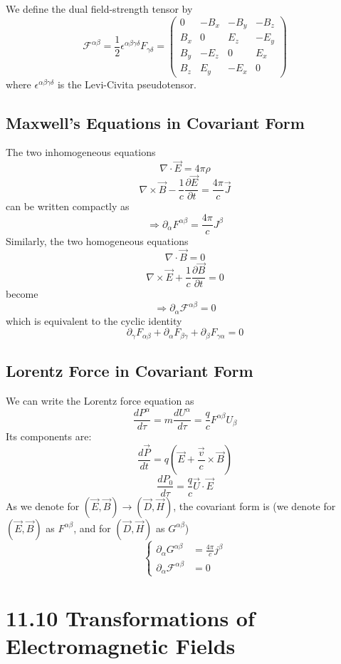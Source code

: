 \documentclass{article}
\begin{document}
	We define the dual field-strength tensor by
	\[
	\mathcal{F}^{\alpha\beta} = \frac{1}{2}\epsilon^{\alpha\beta\gamma\delta}F_{\gamma\delta} = 
	\begin{pmatrix}
		0 & -B_x & -B_y & -B_z \\
		B_x & 0 & E_z & -E_y \\
		B_y & -E_z & 0 & E_x \\
		B_z & E_y & -E_x & 0
	\end{pmatrix}
	\]
	where $\epsilon^{\alpha\beta\gamma\delta}$ is the Levi-Civita pseudotensor.
	
	\subsection*{Maxwell's Equations in Covariant Form}
	The two inhomogeneous equations
	\[
	\nabla \cdot \vec{E} = 4\pi\rho
	\]
	\[
	\nabla \times \vec{B} - \frac{1}{c}\frac{\partial\vec{E}}{\partial t} = \frac{4\pi}{c}\vec{J}
	\]
	can be written compactly as
	\[
	\Rightarrow \partial_\alpha F^{\alpha\beta} = \frac{4\pi}{c}J^\beta
	\]
	Similarly, the two homogeneous equations
	\[
	\nabla \cdot \vec{B} = 0
	\]
	\[
	\nabla \times \vec{E} + \frac{1}{c}\frac{\partial\vec{B}}{\partial t} = 0
	\]
	become
	\[
	\Rightarrow \partial_\alpha \mathcal{F}^{\alpha\beta} = 0
	\]
	which is equivalent to the cyclic identity
	\[
	\partial_\gamma F_{\alpha\beta} + \partial_\alpha F_{\beta\gamma} + \partial_\beta F_{\gamma\alpha} = 0
	\]
	
	\subsection*{Lorentz Force in Covariant Form}
	We can write the Lorentz force equation as
	\[
	\frac{dP^\alpha}{d\tau} = m\frac{dU^\alpha}{d\tau} = \frac{q}{c} F^{\alpha\beta}U_\beta
	\]
	Its components are:
	\[
	\frac{d\vec{P}}{dt} = q(\vec{E} + \frac{\vec{v}}{c} \times \vec{B})
	\]
	\[
	\frac{dP_0}{d\tau} = \frac{q}{c} \vec{U} \cdot \vec{E}
	\]
	As we denote for $(\vec{E}, \vec{B}) \rightarrow (\vec{D}, \vec{H})$, the covariant form is
	(we denote for $(\vec{E}, \vec{B})$ as $F^{\alpha\beta}$, and for $(\vec{D}, \vec{H})$ as $G^{\alpha\beta}$)
	\[
	\left\{
	\begin{aligned}
		\partial_\alpha G^{\alpha\beta} &= \frac{4\pi}{c} j^\beta \\
		\partial_\alpha \mathcal{F}^{\alpha\beta} &= 0
	\end{aligned}
	\right.
	\]
	\section*{11.10 Transformations of Electromagnetic Fields}
	
\end{document}
